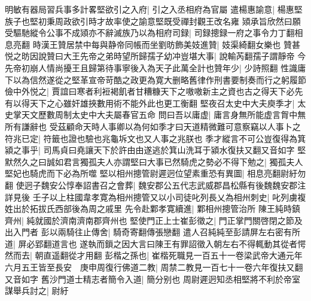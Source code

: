 明敏有器局習兵事多計畧堅欲引之入府|{
	引之入丞相府為官屬}
遣楊惠諭意|{
	楊惠堅族子也堅初秉周政欲引時才故率使之諭意堅既受禪封觀王改名雍}
熲承旨欣然曰願受驅馳縱令公事不成熲亦不辭滅族乃以為相府司録|{
	司録摠録一府之事令力丁翻相息亮翻}
時漢王贊居禁中每與静帝同帳而坐劉昉飾美妓進贊|{
	妓渠綺翻女樂也}
贊甚悦之昉因說贊曰大王先帝之弟時望所歸孺子幼冲豈堪大事|{
	說輸芮翻孺子謂靜帝}
今先帝初崩人情尚擾王且歸第待事寧後入為天子此萬全計也贊年少|{
	少詩照翻}
性識庸下以為信然遂從之堅革宣帝苛酷之政更為寛大删略舊律作刑書要制奏而行之躬履節儉中外悦之|{
	賈誼曰寒者利裋褐飢者甘糟糠天下之嗷嗷新主之資也古之得天下必先有以得天下之心雖奸雄挾數用術不能外此也更工衡翻}
堅夜召太史中大夫庾季才|{
	太史掌天文歷數周制太史中大夫屬春官五命}
問曰吾以庸虚|{
	庸言身無所能虚言胷中無所有謙辭也}
受茲顧命天時人事卿以為何如季才曰天道精微難可意察竊以人事卜之符兆已定|{
	符籤也證也驗也兆龜坼文也又人事之兆朕也}
季才縱言不可公豈復得為箕潁之事乎|{
	司馬貞曰堯讓天下於許由由遂逃於箕山洗耳于潁水復扶又翻又音如字}
堅默然久之曰誠如君言獨孤夫人亦謂堅曰大事已然騎虎之勢必不得下勉之|{
	獨孤夫人堅妃也騎虎而下必為所噬}
堅以相州摠管尉遲迥位望素重恐有異圖|{
	相息亮翻尉紆勿翻}
使迥子魏安公惇奉詔書召之會葬|{
	魏安郡公五代志武威郡昌松縣有後魏魏安郡注詳見後}
壬子以上柱國韋孝寛為相州摠管又以小司徒叱列長乂為相州刺史|{
	叱列虜複姓出於拓拔氏西部後為周之戚里}
先令赴鄴孝寛續進|{
	鄴相州摠管治所}
陳王純時鎮齊州|{
	純就國於濟南濟南郡齊州也}
堅使門正上士崔彭徵之|{
	門正掌門關啓閉之節及出入門者}
彭以兩騎往止傳舍|{
	騎奇寄翻傳張戀翻}
遣人召純純至彭請屏左右密有所道|{
	屏必郢翻道言也}
遂執而鎻之因大言曰陳王有罪詔徵入朝左右不得輒動其從者愕然而去|{
	朝直遥翻從才用翻}
彭楷之孫也|{
	崔楷死職見一百五十一卷梁武帝大通元年}
六月五王皆至長安　庚申周復行佛道二教|{
	周禁二教見一百七十一卷六年復扶又翻又音如字}
舊沙門道士精志者簡令入道|{
	簡分别也}
周尉遲迥知丞相堅將不利於帝室謀舉兵討之|{
	尉紆}



